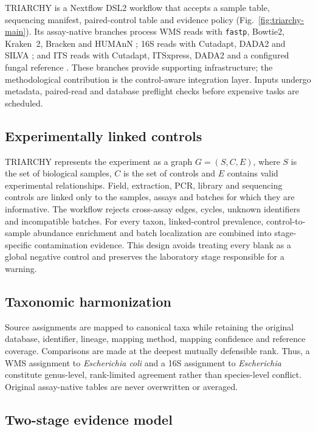 \documentclass[9pt,twocolumn]{extarticle}
\newcommand{\software}[1]{\texttt{#1}}
\begin{document}
TRIARCHY is a Nextflow DSL2 workflow \citep{ditommaso2017} that accepts a
sample table, sequencing manifest, paired-control table and evidence policy
(Fig.~\ref{fig:triarchy-main}). Its assay-native branches process WMS reads
with \software{fastp}, Bowtie2, Kraken~2, Bracken and HUMAnN
\citep{chen2018,langmead2012,wood2019,lu2017,beghini2021}; 16S reads with
Cutadapt, DADA2 and SILVA
\citep{martin2011,callahan2016,quast2013}; and ITS reads with Cutadapt, ITSxpress, DADA2
and a configured fungal reference \citep{martin2011,rivers2018,einarsson2024}.
These branches provide supporting infrastructure; the methodological
contribution is the control-aware integration layer. Inputs undergo metadata,
paired-read and database preflight checks before expensive tasks are scheduled.

\subsection{Experimentally linked controls}

TRIARCHY represents the experiment as a graph $G=(S,C,E)$, where $S$ is
the set of biological samples, $C$ is the set of controls and $E$ contains
valid experimental relationships. Field, extraction, PCR, library and
sequencing controls are linked only to the samples, assays and batches for
which they are informative. The workflow rejects cross-assay edges, cycles,
unknown identifiers and incompatible batches. For every taxon, linked-control
prevalence, control-to-sample abundance enrichment and batch localization are
combined into stage-specific contamination evidence. This design avoids
treating every blank as a global negative control and preserves the laboratory
stage responsible for a warning.

\subsection{Taxonomic harmonization}

Source assignments are mapped to canonical taxa while retaining the original
database, identifier, lineage, mapping method, mapping confidence and reference
coverage. Comparisons are made at the deepest mutually defensible rank. Thus,
a WMS assignment to \emph{Escherichia coli} and a 16S assignment to
\emph{Escherichia} constitute genus-level, rank-limited agreement rather than
species-level conflict. Original assay-native tables are never overwritten or
averaged.

\subsection{Two-stage evidence model}
\end{document}
